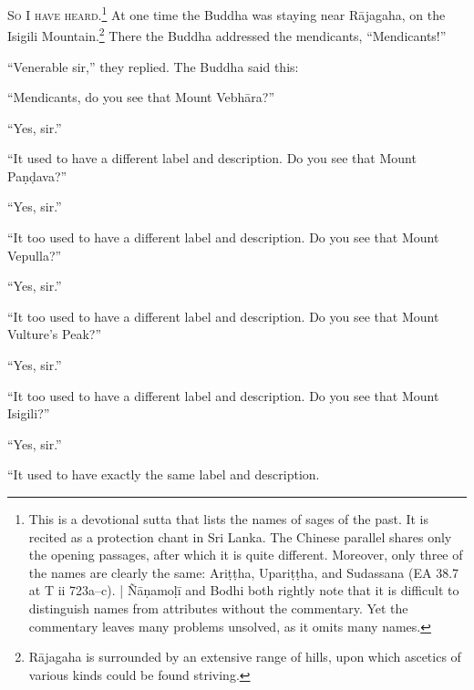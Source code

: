 \documentclass[12pt,openany]{book}%
\newcommand*{\scevam}[1]{\textsc{#1}}
\begin{document}
\scevam{So I have heard.\footnote{This is a devotional sutta that lists the names of sages of the past. It is recited as a protection chant in Sri Lanka. The Chinese parallel shares only the opening passages, after which it is quite different. Moreover, only three of the names are clearly the same: \textsanskrit{Ariṭṭha}, \textsanskrit{Upariṭṭha}, and Sudassana (EA 38.7 at T ii 723a–c). | \textsanskrit{Ñāṇamoḷī} and Bodhi both rightly note that it is difficult to distinguish names from attributes without the commentary. Yet the commentary leaves many problems unsolved, as it omits many names. } }At one time the Buddha was staying near \textsanskrit{Rājagaha}, on the Isigili Mountain.\footnote{\textsanskrit{Rājagaha} is surrounded by an extensive range of hills, upon which ascetics of various kinds could be found striving. } There the Buddha addressed the mendicants, “Mendicants!” 

“Venerable sir,” they replied. The Buddha said this: 

“Mendicants, do you see that Mount \textsanskrit{Vebhāra}?” 

“Yes, sir.” 

“It used to have a different label and description. Do you see that Mount \textsanskrit{Paṇḍava}?” 

“Yes, sir.” 

“It too used to have a different label and description. Do you see that Mount Vepulla?” 

“Yes, sir.” 

“It too used to have a different label and description. Do you see that Mount Vulture’s Peak?” 

“Yes, sir.” 

“It too used to have a different label and description. Do you see that Mount Isigili?” 

“Yes, sir.” 

“It used to have exactly the same label and description. 
\end{document}
